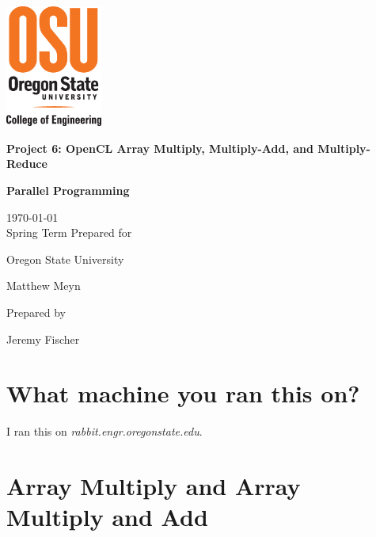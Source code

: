 \documentclass[onecolumn,draftclsnofoot, 10pt, compsoc]{IEEEtran}
\def \Jeremy{			Jeremy Fischer}
\def \Class{		Parallel Programming}
\def \Assn{		Project 6: OpenCL Array Multiply, Multiply-Add, and Multiply-Reduce}
\def \School{	Oregon State University}
\def \Professor{		Matthew Meyn}
\begin{document}
\begin{titlepage}
    \begin{singlespace}
    	\includegraphics[height=4cm]{coe.eps}
        \hfill  
        \par\vspace{.2in}
        \centering
        \scshape{
            \vspace{.5in}
            \textbf{\Large\Assn}\par
            \textbf{\large\Class}\par
            \large{
            	\today \\Spring Term
        	}
            \vfill
            {\large Prepared for}\par
            \huge \School\par
            \vspace{5pt}
            {\Large{\Professor}\par}
            {\large Prepared by }\par

            \vspace{5pt}
            {\Large
                {\Jeremy}\par
            }
            \vspace{20pt}
        }

    \end{singlespace}
\end{titlepage}
\newpage
{}

\clearpage



\section{What machine you ran this on?}
	I ran this on \textit{rabbit.engr.oregonstate.edu}.

\section{Array Multiply and Array Multiply and Add}
\end{document}
